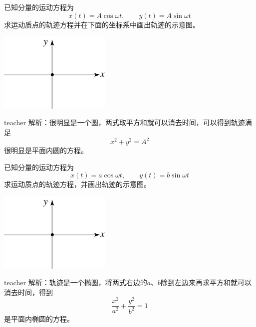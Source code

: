 \begin{example}
已知分量的运动方程为
\[x(t) = A\cos\omega t,\qquad y(t)=A\sin\omega t\]
求运动质点的轨迹方程并在下面的坐标系中画出轨迹的示意图。
\begin{flushright}
\includegraphics[width=0.4\textwidth]{images/motion-problem-35.pdf}
\end{flushright}
\begin{taggedblock}{teacher}
\noindent
解析：很明显是一个圆，两式取平方和就可以消去时间，可以得到轨迹满足
\[x^2+y^2 = A^2\]
很明显是平面内圆的方程。
\end{taggedblock}
\end{example}

\begin{example}
已知分量的运动方程为
\[x(t) = a\cos\omega t,\qquad y(t)=b\sin\omega t\]
求运动质点的轨迹方程，并画出轨迹的示意图。
\begin{flushright}
\includegraphics[width=0.4\textwidth]{images/motion-problem-35.pdf}
\end{flushright}
\begin{taggedblock}{teacher}
\noindent
解析：轨迹是一个椭圆，将两式右边的$a$、$b$除到左边来再求平方和就可以消去时间，得到
\[\frac{x^2}{a^2}+\frac{y^2}{b^2}=1\]
是平面内椭圆的方程。
\end{taggedblock}
\end{example}




